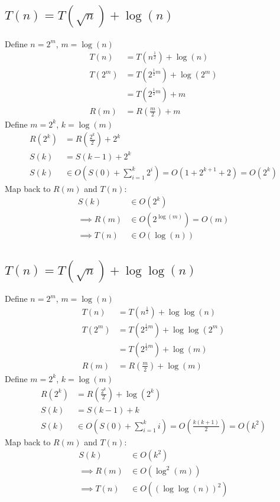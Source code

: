 \documentclass{article}
\begin{document}
\subsection{$T(n) = T(\sqrt{n}) + \log(n)$}
Define $n = 2^m$, $m = \log(n)$ 
\begin{align*}
    T(n) &= T(n^{\frac{1}{2}}) + \log(n)\\
    T(2^m) &= T(2^{\frac{1}{2} m}) + \log(2^m)\\
    &= T(2^{\frac{1}{2} m}) + m\\
    R(m) &= R(\frac{m}{2}) + m
\end{align*}
Define $m = 2^k$, $k = \log(m)$
\begin{align*}
    R(2^k) &= R(\frac{2^k}{2}) + 2^k\\
    S(k) &= S(k-1) + 2^k\\
    S(k) &\in O(S(0) + \sum_{i=1}^{k} 2^i) = O(1 + 2^{k + 1} + 2) = O(2^k)
\end{align*}
Map back to $R(m)$ and $T(n)$:
\begin{align*}
    S(k) &\in O(2^k)\\
    \implies R(m) &\in O(2^{\log(m)}) = O(m)\\
    \implies T(n) &\in O(\log(n))
\end{align*}

\subsection{$T(n) = T(\sqrt{n}) + \log\log(n)$}
Define $n = 2^m$, $m = \log(n)$ 
\begin{align*}
    T(n) &= T(n^{\frac{1}{2}}) + \log\log(n)\\
    T(2^m) &= T(2^{\frac{1}{2} m}) + \log\log(2^m)\\
    &= T(2^{\frac{1}{2} m}) + \log(m)\\
    R(m) &= R(\frac{m}{2}) + \log(m)
\end{align*}
Define $m = 2^k$, $k = \log(m)$
\begin{align*}
    R(2^k) &= R(\frac{2^k}{2}) + \log(2^k)\\
    S(k) &= S(k-1) + k\\
    S(k) &\in O(S(0) + \sum_{i=1}^{k} i) = O(\frac{k(k + 1)}{2}) = O(k^2)
\end{align*}
Map back to $R(m)$ and $T(n)$:
\begin{align*}
    S(k) &\in O(k^2)\\
    \implies R(m) &\in O(\log^2(m))\\
    \implies T(n) &\in O((\log\log(n))^2)
\end{align*}
\end{document}
